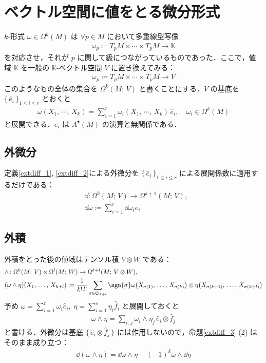 \documentclass[geometry_main]{subfiles}
\begin{document}
\section{ベクトル空間に値をとる微分形式}

$k$-形式 $\omega \in \Omega^k(M)$ は $\forall p \in M$ において多重線型写像
\begin{align}
	\omega_p \coloneqq T_pM \times \cdots  \times T_pM \to \mathbb{K}
\end{align}
を対応させ，それが $p$ に関して\cinfty 級につながっているものであった．ここで，値域 $\mathbb{K}$ を一般の $\mathbb{K}$-ベクトル空間 $V$ に置き換えてみる：
\begin{align}
	\omega_p \coloneqq T_pM \times \cdots  \times T_pM \to V
\end{align}
このようなもの全体の集合を $\Omega^k(M;\, V)$ と書くことにする．$V$ の基底を $\{\, \hat{e}_i\, \}_{1\le i \le r}$ とおくと
\begin{align}
	\omega(X_1,\, \cdots ,\, X_k) = \sum_{i=1}^r \omega_i(X_1,\, \cdots ,\, X_k)\, \hat{e}_i, \quad \omega_i \in \Omega^k(M)
\end{align}
と展開できる．$\hat{e}_i$ は $A^\bullet(M)$ の演算と無関係である．

\subsection{外微分}

定義\ref{extdiff_1}, \ref{extdiff_2}による外微分を $\{\, \hat{e}_i\, \}_{1\le i \le r}$ による展開係数に適用するだけである：
\begin{align}
	&\dd{} \colon \Omega^k(M;\, V) \to \Omega^{k+1}(M;\, V),\\
	&\dd{\omega} \coloneqq \sum_{i=1}^r \dd{\omega_i} \hat{e}_i
\end{align}

\subsection{外積}

外積をとった後の値域はテンソル積 $V \otimes W$ である：
\begin{align}
	&\wedge \colon \Omega^k(M;\, V) \times \Omega^l(M;\, W) \to \Omega^{k+l}(M;\, V \otimes W),\\
	&(\omega \wedge \eta)(X_1,\, \dots ,\, X_{k+l}) \coloneqq \frac{1}{k!\, l!}\sum_{\sigma \in \mathfrak{S}_{k+l}} \sgn{\sigma} \omega\bigl(X_{\sigma(1)},\, \dots ,\, X_{\sigma(k)}\bigr) \otimes \eta\bigl(X_{\sigma(k+1)},\, \dots ,\, X_{\sigma(k+l)}\bigr)
\end{align}
予め $\omega = \sum_{i=1}^r \omega_i \hat{e}_i,\; \eta = \sum_{i=1}^s \eta_i \hat{f}_i$ と展開しておくと
\begin{align}
	\omega \wedge \eta = \sum_{i,\, j} \omega_i \wedge \eta_j\, \hat{e}_i \otimes \hat{f}_j
\end{align}
と書ける．外微分は基底 $\{\, \hat{e}_i \otimes \hat{f}_j\, \}$ には作用しないので，命題\ref{extdiff_3}-(2) はそのまま成り立つ：
\begin{align}
	\dd{(\omega \wedge \eta)} = \dd{\omega} \wedge \eta + (-1)^k \omega \wedge \dd{\eta}
\end{align}
\end{document}
